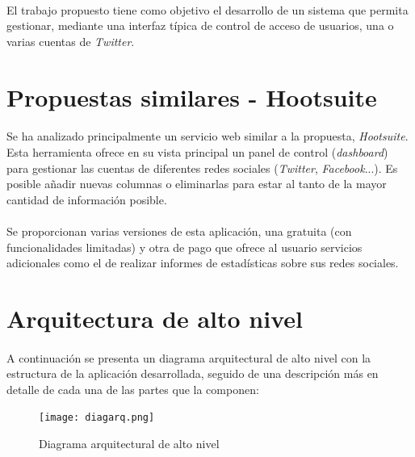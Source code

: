 \documentclass[a4paper]{article}
\begin{document}
	\paragraph{} El trabajo propuesto tiene como objetivo el desarrollo de un sistema que permita gestionar, mediante una interfaz típica de control de acceso de usuarios, una o varias cuentas de \textit{Twitter}.

\section{Propuestas similares - Hootsuite}

	\paragraph{} Se ha analizado principalmente un servicio web similar a la propuesta, \textit{Hootsuite}. Esta herramienta ofrece en su vista principal un panel de control (\textit{dashboard}) para gestionar las cuentas de diferentes redes sociales (\textit{Twitter}, \textit{Facebook}...). Es posible añadir nuevas columnas o eliminarlas para estar al tanto de la mayor cantidad de información posible. 
	
	\paragraph{} Se proporcionan varias versiones de esta aplicación, una gratuita (con funcionalidades limitadas) y otra de pago que ofrece al usuario servicios adicionales como el de realizar informes de estadísticas sobre sus redes sociales.

\section{Arquitectura de alto nivel}
	\paragraph{} A continuación se presenta un diagrama arquitectural de alto nivel con la estructura de la aplicación desarrollada, seguido de una descripción más en detalle de cada una de las partes que la componen:
	\begin{figure}[H]
		\centering
		\texttt{[image: diagarq.png]}
		\caption{Diagrama arquitectural de alto nivel}
		\label{fig:diagarq}
	\end{figure}
	\newpage
\end{document}
